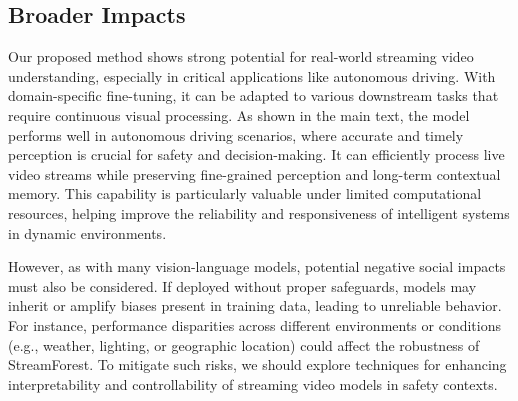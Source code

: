 \subsection{Broader Impacts}
\label{app:sec:Discussions:Broader Impacts}

Our proposed method shows strong potential for real-world streaming video understanding, especially in critical applications like autonomous driving. With domain-specific fine-tuning, it can be adapted to various downstream tasks that require continuous visual processing. As shown in the main text, the model performs well in autonomous driving scenarios, where accurate and timely perception is crucial for safety and decision-making. It can efficiently process live video streams while preserving fine-grained perception and long-term contextual memory. This capability is particularly valuable under limited computational resources, helping improve the reliability and responsiveness of intelligent systems in dynamic environments.

However, as with many vision-language models, potential negative social impacts must also be considered. If deployed without proper safeguards, models may inherit or amplify biases present in training data, leading to unreliable behavior. For instance, performance disparities across different environments or conditions (e.g., weather, lighting, or geographic location) could affect the robustness of StreamForest. To mitigate such risks, we should explore techniques for enhancing interpretability and controllability of streaming video models in safety contexts.

